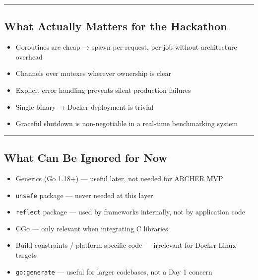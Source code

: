 \documentclass[
]{article}
\providecommand{\tightlist}{%
  \setlength{\itemsep}{0pt}\setlength{\parskip}{0pt}}
\begin{document}
\begin{center}\rule{0.5\linewidth}{0.5pt}\end{center}

\hypertarget{what-actually-matters-for-the-hackathon}{%
\subsection{What Actually Matters for the
Hackathon}\label{what-actually-matters-for-the-hackathon}}

\begin{itemize}
\tightlist
\item
  Goroutines are cheap → spawn per-request, per-job without architecture
  overhead
\item
  Channels over mutexes wherever ownership is clear
\item
  Explicit error handling prevents silent production failures
\item
  Single binary → Docker deployment is trivial
\item
  Graceful shutdown is non-negotiable in a real-time benchmarking system
\end{itemize}

\begin{center}\rule{0.5\linewidth}{0.5pt}\end{center}

\hypertarget{what-can-be-ignored-for-now}{%
\subsection{What Can Be Ignored for
Now}\label{what-can-be-ignored-for-now}}

\begin{itemize}
\tightlist
\item
  Generics (Go 1.18+) --- useful later, not needed for ARCHER MVP
\item
  \texttt{unsafe} package --- never needed at this layer
\item
  \texttt{reflect} package --- used by frameworks internally, not by
  application code
\item
  CGo --- only relevant when integrating C libraries
\item
  Build constraints / platform-specific code --- irrelevant for Docker
  Linux targets
\item
  \texttt{go:generate} --- useful for larger codebases, not a Day 1
  concern
\end{itemize}
\end{document}

